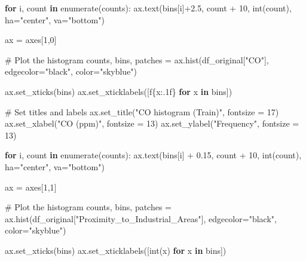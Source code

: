 \documentclass[
  letterpaper,
  DIV=11,
  numbers=noendperiod]{scrartcl}
\newenvironment{Shaded}{\begin{snugshade}}{\end{snugshade}}
\newcommand{\BuiltInTok}[1]{\textcolor[rgb]{0.00,0.23,0.31}{#1}}
\newcommand{\CommentTok}[1]{\textcolor[rgb]{0.37,0.37,0.37}{#1}}
\newcommand{\ControlFlowTok}[1]{\textcolor[rgb]{0.00,0.23,0.31}{\textbf{#1}}}
\newcommand{\DecValTok}[1]{\textcolor[rgb]{0.68,0.00,0.00}{#1}}
\newcommand{\FloatTok}[1]{\textcolor[rgb]{0.68,0.00,0.00}{#1}}
\newcommand{\KeywordTok}[1]{\textcolor[rgb]{0.00,0.23,0.31}{\textbf{#1}}}
\newcommand{\NormalTok}[1]{\textcolor[rgb]{0.00,0.23,0.31}{#1}}
\newcommand{\OperatorTok}[1]{\textcolor[rgb]{0.37,0.37,0.37}{#1}}
\newcommand{\SpecialCharTok}[1]{\textcolor[rgb]{0.37,0.37,0.37}{#1}}
\newcommand{\SpecialStringTok}[1]{\textcolor[rgb]{0.13,0.47,0.30}{#1}}
\newcommand{\StringTok}[1]{\textcolor[rgb]{0.13,0.47,0.30}{#1}}
\begin{document}
\begin{Shaded}
\begin{Highlighting}[]
\ControlFlowTok{for}\NormalTok{ i, count }\KeywordTok{in} \BuiltInTok{enumerate}\NormalTok{(counts):}
\NormalTok{    ax.text(bins[i]}\OperatorTok{+}\FloatTok{2.5}\NormalTok{, count }\OperatorTok{+} \DecValTok{10}\NormalTok{, }\BuiltInTok{int}\NormalTok{(count), ha}\OperatorTok{=}\StringTok{"center"}\NormalTok{, va}\OperatorTok{=}\StringTok{"bottom"}\NormalTok{)}


\NormalTok{ax }\OperatorTok{=}\NormalTok{ axes[}\DecValTok{1}\NormalTok{,}\DecValTok{0}\NormalTok{]}

\CommentTok{\# Plot the histogram}
\NormalTok{counts, bins, patches }\OperatorTok{=}\NormalTok{ ax.hist(df\_original[}\StringTok{"CO"}\NormalTok{], edgecolor}\OperatorTok{=}\StringTok{"black"}\NormalTok{, color}\OperatorTok{=}\StringTok{"skyblue"}\NormalTok{)}

\NormalTok{ax.set\_xticks(bins)  }
\NormalTok{ax.set\_xticklabels([}\SpecialStringTok{f\textquotesingle{}}\SpecialCharTok{\{}\NormalTok{x}\SpecialCharTok{:.1f\}}\SpecialStringTok{\textquotesingle{}} \ControlFlowTok{for}\NormalTok{ x }\KeywordTok{in}\NormalTok{ bins]) }

\CommentTok{\# Set titles and labels}
\NormalTok{ax.set\_title(}\StringTok{"CO histogram (Train)"}\NormalTok{, fontsize }\OperatorTok{=} \DecValTok{17}\NormalTok{)}
\NormalTok{ax.set\_xlabel(}\StringTok{"CO (ppm)"}\NormalTok{, fontsize }\OperatorTok{=} \DecValTok{13}\NormalTok{)}
\NormalTok{ax.set\_ylabel(}\StringTok{"Frequency"}\NormalTok{, fontsize }\OperatorTok{=} \DecValTok{13}\NormalTok{)}

\ControlFlowTok{for}\NormalTok{ i, count }\KeywordTok{in} \BuiltInTok{enumerate}\NormalTok{(counts):}
\NormalTok{    ax.text(bins[i] }\OperatorTok{+} \FloatTok{0.15}\NormalTok{, count }\OperatorTok{+} \DecValTok{10}\NormalTok{, }\BuiltInTok{int}\NormalTok{(count), ha}\OperatorTok{=}\StringTok{"center"}\NormalTok{, va}\OperatorTok{=}\StringTok{"bottom"}\NormalTok{)}

\NormalTok{ax }\OperatorTok{=}\NormalTok{ axes[}\DecValTok{1}\NormalTok{,}\DecValTok{1}\NormalTok{]}

\CommentTok{\# Plot the histogram}
\NormalTok{counts, bins, patches }\OperatorTok{=}\NormalTok{ ax.hist(df\_original[}\StringTok{"Proximity\_to\_Industrial\_Areas"}\NormalTok{], edgecolor}\OperatorTok{=}\StringTok{"black"}\NormalTok{, color}\OperatorTok{=}\StringTok{"skyblue"}\NormalTok{)}

\NormalTok{ax.set\_xticks(bins) }
\NormalTok{ax.set\_xticklabels([}\BuiltInTok{int}\NormalTok{(x) }\ControlFlowTok{for}\NormalTok{ x }\KeywordTok{in}\NormalTok{ bins])}




\end{Highlighting}
\end{Shaded}
\end{document}
